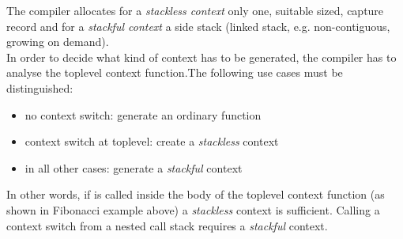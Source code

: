 The compiler allocates for a \emph{stackless context} only one, suitable sized,
capture record and for a \emph{stackful context} a side stack (linked stack,
e.g. non-contiguous, growing on demand).\\
In order to decide what kind of context has to be generated, the compiler has to
analyse the toplevel context function.The following use cases must be
distinguished:
\begin{itemize}
    \item no context switch: generate an ordinary function
    \item context switch at toplevel: create a \emph{stackless} context
    \item in all other cases: generate a \emph{stackful} context
\end{itemize}
In other words, if \ectxop is called inside the body of the toplevel context
function (as shown in Fibonacci example above) a \emph{stackless} context is
sufficient.
Calling a context switch from a nested call stack requires a \emph{stackful}
context.
